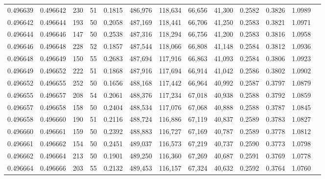 \begin{tabular}{rrrrrrrrrrrrr}
0.496639 & 0.496642 &   230 &  51 &                                     0.1815 & 486,976 & 118,634 &  66,656 &  41,300 & 0.2582 & 0.3826 & 1.0989 \\
0.496642 & 0.496644 &   193 &  50 &                                     0.2058 & 487,169 & 118,441 &  66,706 &  41,250 & 0.2583 & 0.3821 & 1.0971 \\
0.496644 & 0.496646 &   147 &  50 &                                     0.2538 & 487,316 & 118,294 &  66,756 &  41,200 & 0.2583 & 0.3816 & 1.0958 \\
0.496646 & 0.496648 &   228 &  52 &                                     0.1857 & 487,544 & 118,066 &  66,808 &  41,148 & 0.2584 & 0.3812 & 1.0936 \\
0.496648 & 0.496649 &   150 &  55 &                                     0.2683 & 487,694 & 117,916 &  66,863 &  41,093 & 0.2584 & 0.3806 & 1.0923 \\
0.496649 & 0.496652 &   222 &  51 &                                     0.1868 & 487,916 & 117,694 &  66,914 &  41,042 & 0.2586 & 0.3802 & 1.0902 \\
0.496652 & 0.496655 &   252 &  50 &                                     0.1656 & 488,168 & 117,442 &  66,964 &  40,992 & 0.2587 & 0.3797 & 1.0879 \\
0.496655 & 0.496657 &   208 &  54 &                                     0.2061 & 488,376 & 117,234 &  67,018 &  40,938 & 0.2588 & 0.3792 & 1.0859 \\
0.496657 & 0.496658 &   158 &  50 &                                     0.2404 & 488,534 & 117,076 &  67,068 &  40,888 & 0.2588 & 0.3787 & 1.0845 \\
0.496658 & 0.496660 &   190 &  51 &                                     0.2116 & 488,724 & 116,886 &  67,119 &  40,837 & 0.2589 & 0.3783 & 1.0827 \\
0.496660 & 0.496661 &   159 &  50 &                                     0.2392 & 488,883 & 116,727 &  67,169 &  40,787 & 0.2589 & 0.3778 & 1.0812 \\
0.496661 & 0.496662 &   154 &  50 &                                     0.2451 & 489,037 & 116,573 &  67,219 &  40,737 & 0.2590 & 0.3773 & 1.0798 \\
0.496662 & 0.496664 &   213 &  50 &                                     0.1901 & 489,250 & 116,360 &  67,269 &  40,687 & 0.2591 & 0.3769 & 1.0778 \\
0.496664 & 0.496666 &   203 &  55 &                                     0.2132 & 489,453 & 116,157 &  67,324 &  40,632 & 0.2592 & 0.3764 & 1.0760 \\

\end{tabular}
